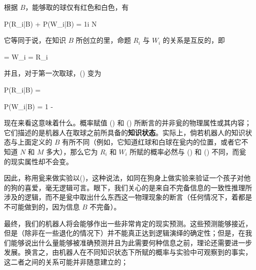 根据 $B$，能够取的球仅有红色和白色，有

\placeformula[3-6]
\startformula
P(R_i|B) + P(W_i|B) = 1\quad{}\le i \le N
\stopformula

它等同于说，在知识 $B$ 所创立的里，命题 $R_i$ 与 $W_i$ 的关系是互反的，即

\placeformula[3-7]
\startformula
{} = W_i\quad\quad {} = R_i
\stopformula

并且，对于第一次取球，(\in[3-5]) 变为

\placeformula[3-8]
\startformula
P(R_i|B) = 
\stopformula

\placeformula[3-9]
\startformula
P(W_i|B) = 1 - 
\stopformula

现在来看这意味着什么。概率赋值 (\in[3-8]) 和 (\in[3-9]) 所断言的并非瓮的物理属性或其内容；它们描述的是机器人在取球之前所具备的{\bf 知识状态}。实际上，倘若机器人的知识状态与上面定义的 $B$ 有所不同（例如，它知道红球和白球在瓮内的位置，或者它不知道 $N$ 和 $M$ 多大），那么它为 $R_i$ 和 $W_i$ 所赋的概率必然与 (\in[3-8]) 和 (\in[3-9]) 不同，而瓮的现实属性却不会变。

因此，称用瓮来做实验以(\in[3-8])，这种说法，如同在狗身上做实验来验证一个孩子对他的狗的喜爱，毫无逻辑可言。眼下，我们关心的是来自不完备信息的一致性推理所涉及的逻辑，而不是瓮中取出什么东西这一物理现象的断言（任何情况下，着都是不可能做到的，因为信息 $B$ 不完备）。

最终，我们的机器人将会能够作出一些非常肯定的现实预测。这些预测能够接近，但是（除非在一些退化的情况下）并不能真正达到逻辑演绎的确定性；但是，在我们能够说出什么量能够被准确预测并且为此需要何种信息之前，理论还需要进一步发展。换言之，由机器人在不同知识状态下所赋的概率与实验中可观察到的事实，这二者之间的关系可能并非随意建立的；